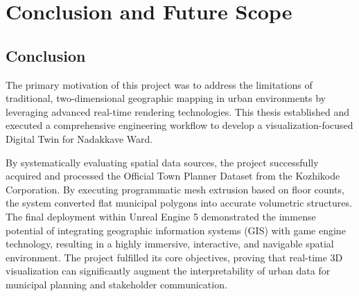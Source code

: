 
\chapter{Conclusion and Future Scope}
\label{ch:conclusion}

\section{Conclusion}
The primary motivation of this project was to address the limitations of traditional, two-dimensional geographic mapping in urban environments by leveraging advanced real-time rendering technologies. This thesis established and executed a comprehensive engineering workflow to develop a visualization-focused Digital Twin for Nadakkave Ward. 

By systematically evaluating spatial data sources, the project successfully acquired and processed the Official Town Planner Dataset from the Kozhikode Corporation. By executing programmatic mesh extrusion based on floor counts, the system converted flat municipal polygons into accurate volumetric structures. The final deployment within Unreal Engine 5 demonstrated the immense potential of integrating geographic information systems (GIS) with game engine technology, resulting in a highly immersive, interactive, and navigable spatial environment. The project fulfilled its core objectives, proving that real-time 3D visualization can significantly augment the interpretability of urban data for municipal planning and stakeholder communication.

